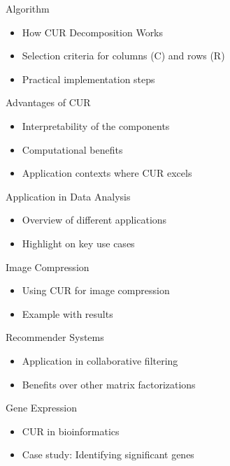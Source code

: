 \documentclass[pdf]
{beamer}
\begin{document}
\begin{frame}{Algorithm}
    \begin{itemize}
        \item How CUR Decomposition Works
        \item Selection criteria for columns (C) and rows (R)
        \item Practical implementation steps
    \end{itemize}
\end{frame}

\begin{frame}{Advantages of CUR}
    \begin{itemize}
        \item Interpretability of the components
        \item Computational benefits
        \item Application contexts where CUR excels
    \end{itemize}
\end{frame}

\begin{frame}{Application in Data Analysis}
    \begin{itemize}
        \item Overview of different applications
        \item Highlight on key use cases
    \end{itemize}
\end{frame}

\begin{frame}{Image Compression}
    \begin{itemize}
        \item Using CUR for image compression
        \item Example with results
    \end{itemize}
\end{frame}

\begin{frame}{Recommender Systems}
    \begin{itemize}
        \item Application in collaborative filtering
        \item Benefits over other matrix factorizations
    \end{itemize}
\end{frame}

\begin{frame}{Gene Expression}
    \begin{itemize}
        \item CUR in bioinformatics
        \item Case study: Identifying significant genes
    \end{itemize}
\end{frame}
\end{document}

